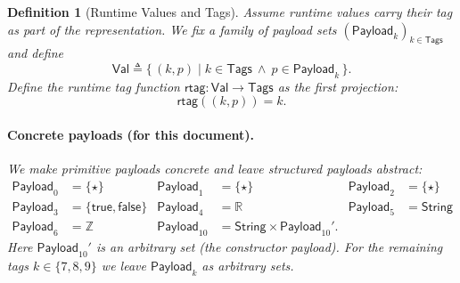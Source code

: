 \documentclass[11pt]{article}
\newtheorem{definition}[theorem]{Definition}
\newcommand{\String}{\mathsf{String}}
\newcommand{\Tags}{\mathsf{Tags}}
\newcommand{\rtag}{\mathsf{rtag}}
\newcommand{\Val}{\mathsf{Val}}
\newcommand{\Payload}{\mathsf{Payload}}
\begin{document}
\begin{definition}[Runtime Values and Tags]
\label{def:runtime-values-tags}
Assume runtime values carry their tag as part of the representation.
We fix a family of payload sets $(\Payload_k)_{k \in \Tags}$ and define
\[
\Val \triangleq \{\, (k,p) \mid k \in \Tags \ \land\ p \in \Payload_k \,\}.
\]
Define the runtime tag function $\rtag : \Val \to \Tags$ as the first projection:
\[
\rtag((k,p)) = k.
\]
\paragraph{Concrete payloads (for this document).}
We make primitive payloads concrete and leave structured payloads abstract:
\begin{align*}
\Payload_0 &= \{\star\} & \Payload_1 &= \{\star\} & \Payload_2 &= \{\star\} \\
\Payload_3 &= \{\mathsf{true},\mathsf{false}\} & \Payload_4 &= \mathbb{R} & \Payload_5 &= \String \\
\Payload_6 &= \mathbb{Z} & \Payload_{10} &= \String \times \Payload_{10}'.
\end{align*}
Here $\Payload_{10}'$ is an arbitrary set (the constructor payload).
For the remaining tags $k \in \{7,8,9\}$ we leave $\Payload_k$ as arbitrary sets.
\end{definition}
\end{document}
